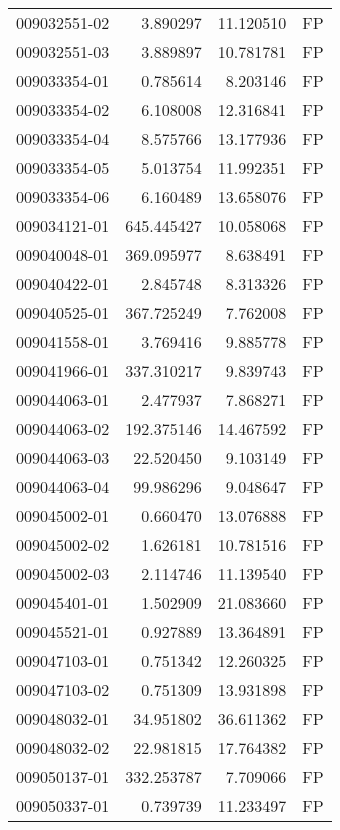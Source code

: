 \begin{tabular}{lrrl}
009032551-02 &    3.890297 &      11.120510 &   FP \\
009032551-03 &    3.889897 &      10.781781 &   FP \\
009033354-01 &    0.785614 &       8.203146 &   FP \\
009033354-02 &    6.108008 &      12.316841 &   FP \\
009033354-04 &    8.575766 &      13.177936 &   FP \\
009033354-05 &    5.013754 &      11.992351 &   FP \\
009033354-06 &    6.160489 &      13.658076 &   FP \\
009034121-01 &  645.445427 &      10.058068 &   FP \\
009040048-01 &  369.095977 &       8.638491 &   FP \\
009040422-01 &    2.845748 &       8.313326 &   FP \\
009040525-01 &  367.725249 &       7.762008 &   FP \\
009041558-01 &    3.769416 &       9.885778 &   FP \\
009041966-01 &  337.310217 &       9.839743 &   FP \\
009044063-01 &    2.477937 &       7.868271 &   FP \\
009044063-02 &  192.375146 &      14.467592 &   FP \\
009044063-03 &   22.520450 &       9.103149 &   FP \\
009044063-04 &   99.986296 &       9.048647 &   FP \\
009045002-01 &    0.660470 &      13.076888 &   FP \\
009045002-02 &    1.626181 &      10.781516 &   FP \\
009045002-03 &    2.114746 &      11.139540 &   FP \\
009045401-01 &    1.502909 &      21.083660 &   FP \\
009045521-01 &    0.927889 &      13.364891 &   FP \\
009047103-01 &    0.751342 &      12.260325 &   FP \\
009047103-02 &    0.751309 &      13.931898 &   FP \\
009048032-01 &   34.951802 &      36.611362 &   FP \\
009048032-02 &   22.981815 &      17.764382 &   FP \\
009050137-01 &  332.253787 &       7.709066 &   FP \\
009050337-01 &    0.739739 &      11.233497 &   FP \\

\end{tabular}

